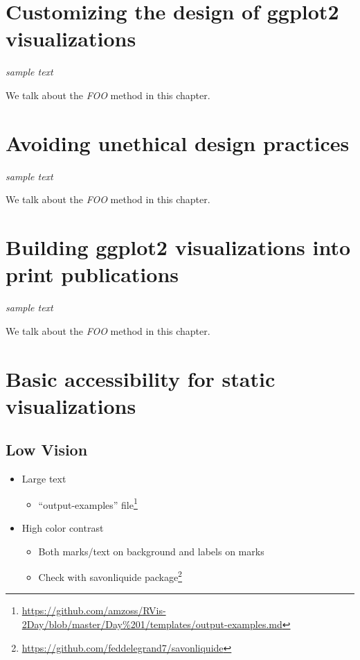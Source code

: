 \documentclass[
]{krantz}
\providecommand{\tightlist}{%
  \setlength{\itemsep}{0pt}\setlength{\parskip}{0pt}}
\renewcommand{\href}[2]{#2\footnote{\url{#1}}}
\begin{document}
\hypertarget{customizing-visualization-design}{%
\chapter{Customizing the design of ggplot2 visualizations}\label{customizing-visualization-design}}

\emph{sample text}

We talk about the \emph{FOO} method in this chapter.

\hypertarget{ethical-design-practices}{%
\chapter{Avoiding unethical design practices}\label{ethical-design-practices}}

\emph{sample text}

We talk about the \emph{FOO} method in this chapter.

\hypertarget{print-publications}{%
\chapter{Building ggplot2 visualizations into print publications}\label{print-publications}}

\emph{sample text}

We talk about the \emph{FOO} method in this chapter.

\hypertarget{accessibility-for-visualizations}{%
\chapter{Basic accessibility for static visualizations}\label{accessibility-for-visualizations}}

\hypertarget{low-vision}{%
\section{Low Vision}\label{low-vision}}

\begin{itemize}
\item
  Large text

  \begin{itemize}
  \tightlist
  \item
    \href{https://github.com/amzoss/RVis-2Day/blob/master/Day\%201/templates/output-examples.md}{``output-examples'' file}
  \end{itemize}
\item
  High color contrast

  \begin{itemize}
  \item
    Both marks/text on background and labels on marks
  \item
    Check with \href{https://github.com/feddelegrand7/savonliquide}{savonliquide package}
  \end{itemize}
\end{itemize}
\end{document}
